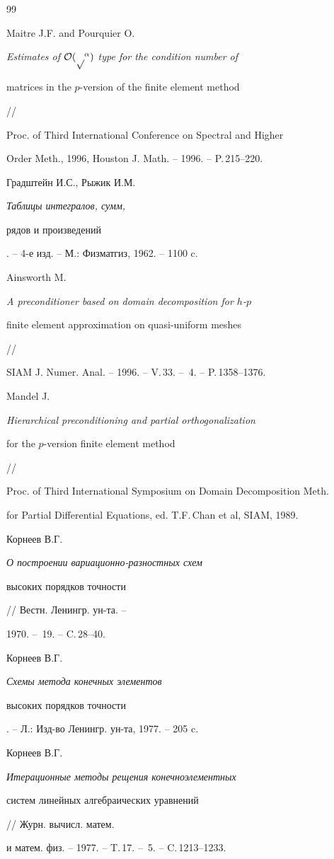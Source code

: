 \begin{thebibliography}{99}


Maitre J.F. and Pourquier O.


{\it Estimates of $\cal O(p^\alpha)$ type for the condition number of


matrices in the $p$-version of the finite element method} //


Proc. of Third International Conference on Spectral and Higher


Order Meth., 1996, Houston J. Math. -- 1996. -- P.\,215--220.




Градштейн И.С., Рыжик И.М. {\it Таблицы интегралов, сумм,


рядов и произведений}. -- 4-е изд. -- М.: Физматгиз, 1962. -- 1100 c.




Ainsworth M.


{\it A preconditioner based on domain decomposition for $h$-$p$


finite element approximation on quasi-uniform meshes} //


SIAM J. Numer. Anal. -- 1996. -- V.\,33. -- \No\,4. -- P.\,1358--1376.




Mandel J.


{\it Hierarchical preconditioning and partial orthogonalization


for the $p$-version finite element method} //


Proc. of Third International Symposium on Domain Decomposition Meth.


for Partial Differential Equations, ed. T.F.\,Chan et al, SIAM, 1989.




Корнеев В.Г. { \it О построении вариационно-разностных схем


высоких порядков точности} // Вестн. Ленингр. ун-та. --


1970. -- \No\,19. -- C.\,28--40.




Корнеев В.Г. {\it Схемы метода конечных элементов 


высоких порядков точности}. -- Л.: Изд-во Ленингр. ун-та, 1977. -- 205 c.




Корнеев В.Г. {\it Итерационные методы рещения конечноэлементных


систем линейных алгебраических уравнений} // Журн. вычисл. матем. 


и матем. физ. -- 1977. -- T.\,17. -- \No\,5. -- C.\,1213--1233.





\end{thebibliography}


